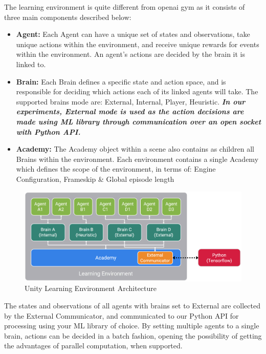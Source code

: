 The learning environment is quite different from openai gym as it consists of three main components described below:

\begin{itemize}
		\item \textbf{Agent:} Each Agent can have a unique set of states and observations, take unique actions within the environment, and receive unique rewards for events within the environment. An agent’s actions are decided by the brain it is linked to.
		\item \textbf{Brain:} Each Brain defines a specific state and action space, and is responsible for deciding which actions each of its linked agents will take. The supported brains mode are: External, Internal, Player, Heuristic. \textit{\textbf{In our experiments, External mode is used as the action decisions are made using ML library through communication over an open socket with Python API.}}
		\item \textbf{Academy:} The Academy object within a scene also contains as children all Brains within the environment. Each environment contains a single Academy which defines the scope of the environment, in terms of: Engine Configuration, Frameskip \& Global episode length
\end{itemize}

\begin{figure}[!htb]
		\centering
		\includegraphics[width=\linewidth]{figures/unity_api.png}
		\caption{Unity Learning Environment Architecture}
		\label{fig:unity_api}
\end{figure}

The states and observations of all agents with brains set to External are collected by the External Communicator, and communicated to our Python API for processing using your ML library of choice. By setting multiple agents to a single brain, actions can be decided in a batch fashion, opening the possibility of getting the advantages of parallel computation, when supported.

